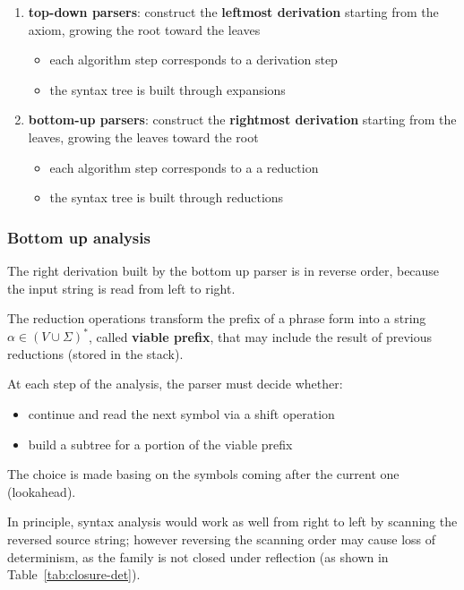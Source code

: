 \documentclass[english]{article}
\begin{document}
\begin{enumerate}
  \item \textbf{top-down parsers}: construct the \textbf{leftmost derivation} starting from the axiom, growing the root toward the leaves
        \begin{itemize}
          \item each algorithm step corresponds to a derivation step
          \item the syntax tree is built through expansions
        \end{itemize}
  \item \textbf{bottom-up parsers}: construct the \textbf{rightmost derivation} starting from the leaves, growing the leaves toward the root
        \begin{itemize}
          \item each algorithm step corresponds to a a reduction
          \item the syntax tree is built through reductions
        \end{itemize}
\end{enumerate}

\subsubsection{Bottom up analysis}

The right derivation built by the bottom up parser is in reverse order, because the input string is read from left to right.

The reduction operations transform the prefix of a phrase form into a string \(\alpha \in \left( V \cup \Sigma \right)^\ast\), called \textbf{viable prefix}, that may include the result of previous reductions (stored in the stack).

At each step of the analysis, the parser must decide whether:

\begin{itemize}
  \item continue and read the next symbol via a shift operation
  \item build a subtree for a portion of the viable prefix
\end{itemize}

The choice is made basing on the symbols coming after the current one (lookahead).

\bigskip
In principle, syntax analysis would work as well from right to left by scanning the reversed source string;
however reversing the scanning order may cause loss of determinism, as the \DET family is not closed under reflection (as shown in Table~\ref{tab:closure-det}).
\end{document}
